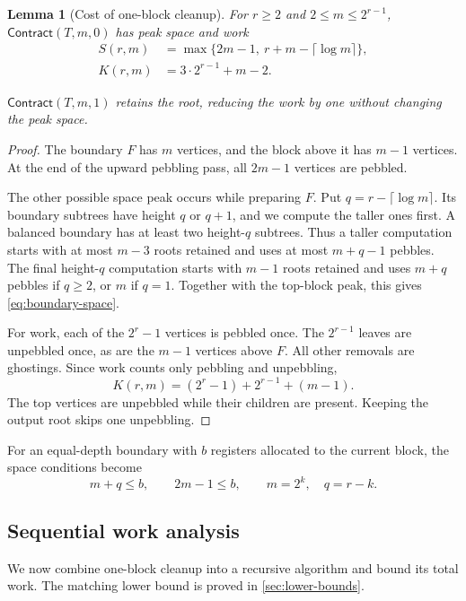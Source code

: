 \documentclass[11pt]{article}
\newtheorem{lemma}[lemma]{Lemma}
\theoremstyle{definition}
\theoremstyle{remark}
\newcommand{\Contract}{\mathsf{Contract}}
\begin{document}
\begin{lemma}[Cost of one-block cleanup]
\label{lem:contract}
For $r\ge2$ and $2\le m\le2^{r-1}$, $\Contract(T,m,0)$ has peak space and work
\begin{align}
 S(r,m)&=\max\{2m-1,\ r+m-\lceil\log m\rceil\}, \label{eq:boundary-space}\\
 K(r,m)&=3\cdot2^{r-1}+m-2. \label{eq:block-work}
\end{align}

$\Contract(T,m,1)$ retains the root, reducing the work by one without changing the peak space.
\end{lemma}

\begin{proof}
The boundary $F$ has $m$ vertices, and the block above it has $m-1$ vertices. At the end of the upward pebbling pass, all $2m-1$ vertices are pebbled.

The other possible space peak occurs while preparing $F$. Put $q=r-\lceil\log m\rceil$. Its boundary subtrees have height $q$ or $q+1$, and we compute the taller ones first. A balanced boundary has at least two height-$q$ subtrees. Thus a taller computation starts with at most $m-3$ roots retained and uses at most $m+q-1$ pebbles. The final height-$q$ computation starts with $m-1$ roots retained and uses $m+q$ pebbles if $q\ge2$, or $m$ if $q=1$. Together with the top-block peak, this gives \cref{eq:boundary-space}.

For work, each of the $2^r-1$ vertices is pebbled once. The $2^{r-1}$ leaves are unpebbled once, as are the $m-1$ vertices above $F$. All other removals are ghostings. Since work counts only pebbling and unpebbling,
\[
 K(r,m)=(2^r-1)+2^{r-1}+(m-1).
\]
The top vertices are unpebbled while their children are present. Keeping the output root skips one unpebbling.
\end{proof}

For an equal-depth boundary with $b$ registers allocated to the current block, the space conditions become
\begin{equation}
 m+q\le b,\qquad 2m-1\le b,\qquad m=2^k,\quad q=r-k.
 \label{eq:feasible-cut}
\end{equation}

\subsection{Sequential work analysis}
\label{sec:sequential}

We now combine one-block cleanup into a recursive algorithm and bound its total work. The matching lower bound is proved in \cref{sec:lower-bounds}.
\end{document}

